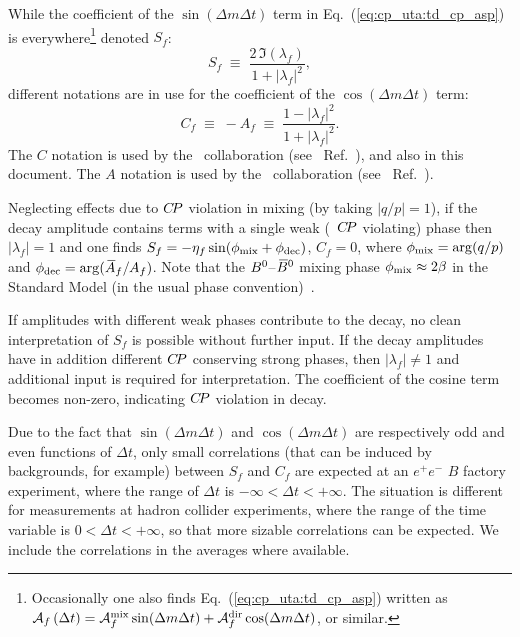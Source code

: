 While the coefficient of the $\sin(\Delta m \Delta t)$ term in 
Eq.~(\ref{eq:cp_uta:td_cp_asp}) is everywhere\footnote
{
  Occasionally one also finds Eq.~(\ref{eq:cp_uta:td_cp_asp}) written as
  ${\cal A}_{f} \left(\Delta t\right) = 
  {\cal A}^{\rm mix}_f \sin(\Delta m \Delta t) + {\cal A}^{\rm dir}_f \cos(\Delta m \Delta t)$,
  or similar.
} denoted $S_f$:
\begin{equation}
  \label{eq:cp_uta:s_def}
  S_f \;\equiv\; \frac{2\, \Im(\lambda_f)}{1 + \left|\lambda_f\right|^2},
\end{equation}
different notations are in use for the
coefficient of the $\cos(\Delta m \Delta t)$ term:
\begin{equation}
  \label{eq:cp_uta:c_def}
  C_f \;\equiv\; - A_f \;\equiv\; \frac{1 - \left|\lambda_f\right|^2}{1 + \left|\lambda_f\right|^2}.
\end{equation}
The $C$ notation is used by the \babar\  collaboration 
(see \eg\ Ref.~\cite{Aubert:2001sp}), 
and also in this document.
The $A$ notation is used by the \belle\ collaboration
(see \eg\ Ref.~\cite{Abe:2001xe}).

Neglecting effects due to $C\!P$ violation in mixing 
(by taking $|q/p| = 1$),
if the decay amplitude contains terms with 
a single weak (\ie\ $C\!P$ violating) phase
then $\left|\lambda_f\right| = 1$ and one finds
$S_f = -{\eta_f} \sin(\phi_{\rm mix} + \phi_{\rm dec})$, $C_f = 0$,
where $\phi_{\rm mix}=\arg(q/p)$ and $\phi_{\rm dec}=\arg(\kern 0.18em\overline{\kern -0.18em A}{}_f/A_f)$.
Note that the $B^0$--$\kern 0.18em\overline{\kern -0.18em B}{}^0$ mixing phase $\phi_{\rm mix}\approx2\beta$
in the Standard Model (in the usual phase convention)~\cite{Carter:1980tk,Bigi:1981qs}. 

If amplitudes with different weak phases contribute to the decay, 
no clean interpretation of $S_f$ is possible without further input. 
If the decay amplitudes have in addition different $C\!P$ conserving strong phases, then $\left| \lambda_f \right| \neq 1$ and additional input is required for interpretation.
The coefficient of the cosine term becomes non-zero,
indicating $C\!P$ violation in decay.

Due to the fact that $\sin(\Delta m \Delta t)$ and $\cos(\Delta m \Delta t)$
are respectively odd and even functions of $\Delta t$, only small correlations
(that can be induced by backgrounds, for example) between $S_f$ and $C_f$ are
expected at an $e^+e^-$ $B$ factory experiment, where the range of $\Delta t$
is $-\infty < \Delta t < +\infty$. 
The situation is different for measurements at hadron collider experiments, where the range of the time variable is $0 < \Delta t < +\infty$, so that more sizable correlations can be expected.  
We include the correlations in the averages where available.

